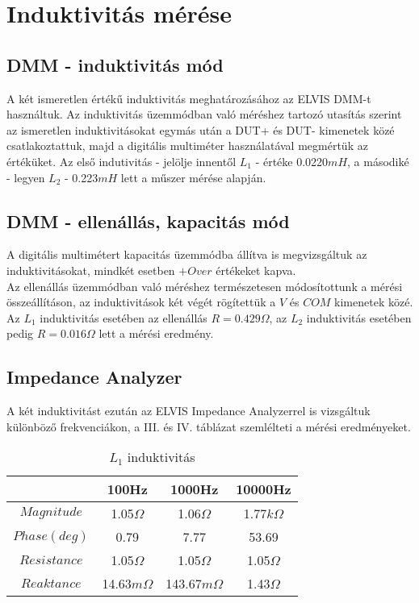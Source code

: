 \documentclass[10pt, conference,a4paper]{ITKproc}
\begin{document}
\section{Induktivitás mérése}
\subsection{DMM - induktivitás mód}
A két ismeretlen értékű induktivitás meghatározásához az ELVIS DMM-t használtuk. Az induktivitás üzemmódban való méréshez tartozó utasítás szerint az ismeretlen induktivitásokat egymás után a DUT+ és DUT- kimenetek közé csatlakoztattuk, majd a digitális multiméter használatával megmértük az értéküket. Az első indutivitás - jelölje innentől $L_1$ - értéke 0.0220$mH$, a másodiké - legyen $L_2$ - 0.223$mH$ lett a műszer mérése alapján. 
\subsection{DMM - ellenállás, kapacitás mód}
A digitális multimétert kapacitás üzemmódba állítva is megvizsgáltuk az induktivitásokat, mindkét esetben $+Over$ értékeket kapva. \\
Az ellenállás üzemmódban való méréshez természetesen módosítottunk a mérési összeállításon, az induktivitások két végét rögítettük a $V$ és $COM$ kimenetek közé. Az $L_1$ induktivitás esetében az ellenállás $R = 0.429\Omega$, az $L_2$ induktivitás esetében pedig $R = 0.016\Omega$ lett a mérési eredmény. 
\subsection{Impedance Analyzer}
A két induktivitást ezután az ELVIS Impedance Analyzerrel is vizsgáltuk különböző frekvenciákon, a III. és IV. táblázat szemlélteti a mérési eredményeket. 

\begin{table}[!t]
\renewcommand{\arraystretch}{1.3}
\caption{$L_1$ induktivitás}
\centering
\begin{tabular}{c||c||c||c}
\hline
\bfseries & \bfseries 100Hz & \bfseries 1000Hz & \bfseries 10000Hz\\
\hline\hline
$Magnitude$ & 1.05$\Omega$ & 1.06$\Omega$  & 1.77$k\Omega$\\
\hline
$Phase(deg)$ & 0.79 & 7.77  & 53.69\\
\hline
$Resistance$ & 1.05$\Omega$ & 1.05$\Omega$  & 1.05$\Omega$\\
\hline
$Reaktance$ & 14.63$m\Omega$ & 143.67$m\Omega$  & 1.43$\Omega$\\
\hline
\end{tabular}
\end{table}
\end{document}
